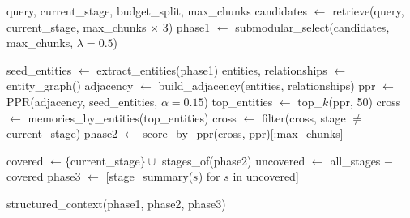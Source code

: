 \documentclass[11pt]{article}
\begin{document}
\begin{algorithm}[H]
\caption{StageAwareContextAssembler}
\label{alg:assemble}
\begin{algorithmic}[1]
\REQUIRE query, current\_stage, budget\_split, max\_chunks
\STATE {}
\STATE candidates $\leftarrow$ retrieve(query, current\_stage, max\_chunks $\times$ 3)
\STATE phase1 $\leftarrow$ submodular\_select(candidates, max\_chunks, $\lambda = 0.5$)

\STATE {}
\STATE seed\_entities $\leftarrow$ extract\_entities(phase1)
\STATE entities, relationships $\leftarrow$ entity\_graph()
\STATE adjacency $\leftarrow$ build\_adjacency(entities, relationships)
\STATE ppr $\leftarrow$ PPR(adjacency, seed\_entities, $\alpha = 0.15$)
\STATE top\_entities $\leftarrow$ top\_$k$(ppr, 50)
\STATE cross $\leftarrow$ memories\_by\_entities(top\_entities)
\STATE cross $\leftarrow$ filter(cross, stage $\neq$ current\_stage)
\STATE phase2 $\leftarrow$ score\_by\_ppr(cross, ppr)[:max\_chunks]

\STATE {}
\STATE covered $\leftarrow \{$current\_stage$\} \cup$ stages\_of(phase2)
\STATE uncovered $\leftarrow$ all\_stages $-$ covered
\STATE phase3 $\leftarrow$ [stage\_summary($s$) for $s$ in uncovered]

\RETURN structured\_context(phase1, phase2, phase3)
\end{algorithmic}
\end{algorithm}




\end{document}

